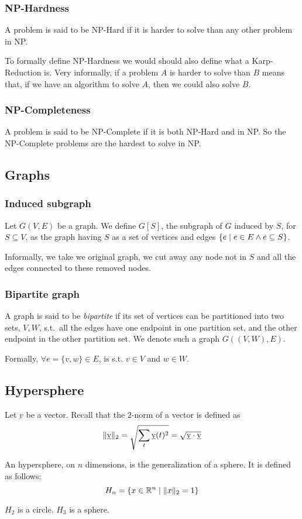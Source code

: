     \subsubsection{NP-Hardness}
        A problem is said to be NP-Hard if it is harder to solve than any other problem in NP.

        To formally define NP-Hardness we would should also define what a Karp-Reduction is.
        Very informally, if a problem $A$ is harder to solve than $B$ means that, if we have an algorithm to solve $A$, then we could also solve $B$.

    \subsubsection{NP-Completeness}
        A problem is said to be NP-Complete if it is both NP-Hard and in NP.
        So the NP-Complete problems are the hardest to solve in NP.


\subsection{Graphs}

    \subsubsection{Induced subgraph}\label{subsubsec:induced_subgraph}
        Let $G(V,E)$ be a graph. We define $G[S]$, the subgraph of $G$ induced by $S$, for $S \subseteq V$, as the graph having $S$ as a set of vertices and edges $\{ e \; \vert \; e \in E \wedge e \subseteq S \}$.

        Informally, we take we original graph, we cut away any node not in $S$ and all the edges connected to these removed nodes.

    \subsubsection{Bipartite graph}\label{subsubsec:bipartitegraph}
        A graph is said to be \textit{bipartite} if its set of vertices can be partitioned into two sets, $V,W$, s.t.~all the edges have one endpoint in one partition set, and the other endpoint in the other partition set.
        We denote such a graph $G((V,W),E)$.

        Formally, $\forall e = \{v,w\} \in E$, is s.t. $v \in V$ and $w \in W$.


\subsection{Hypersphere}\label{subsec:hypersphere}
    Let $\underbar{v}$ be a vector. Recall that the $2$-norm of a vector is defined as
    \[ \lVert \underbar{v} \rVert_2 = \sqrt{\sum_t \underbar{v}(t)^2} = \sqrt{\underbar{v} \cdot \underbar{v}} \]

    An hypersphere, on $n$ dimensions, is the generalization of a sphere.
    It is defined as follows:
    \[ H_n = \{ x \in \mathbb{R}^n \; \vert \; \lVert x \rVert_2 = 1 \} \]

    $H_2$ is a circle. $H_3$ is a sphere.